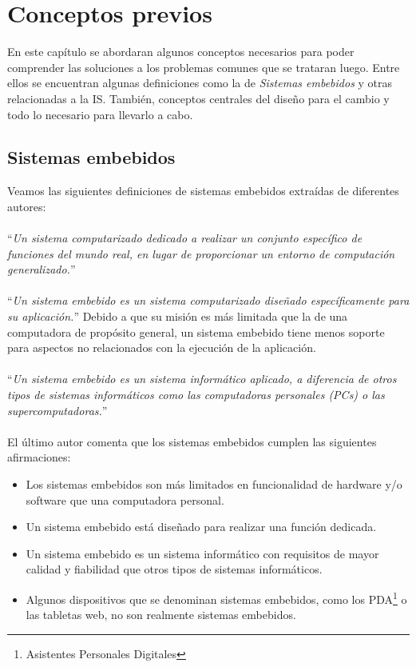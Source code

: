 \chapter{Conceptos previos}

En este capítulo se abordaran algunos conceptos necesarios para poder comprender las soluciones a los problemas comunes que se trataran luego. Entre ellos se encuentran algunas definiciones como la de \textit{Sistemas embebidos} y otras relacionadas a la IS. También, conceptos centrales del diseño para el cambio y todo lo necesario para llevarlo a cabo.


\section{Sistemas embebidos}
Veamos las siguientes definiciones de sistemas embebidos extraídas de diferentes autores:
\\\\
\noindent
``\textit{Un sistema computarizado dedicado a realizar un conjunto específico de funciones del mundo real, en lugar de proporcionar un entorno de computación generalizado.}''~\cite{douglass}
\\\\
\noindent
``\textit{Un sistema embebido es un sistema computarizado diseñado específicamente para su aplicación.}'' Debido a que su misión es más limitada que la de una computadora de propósito general, un sistema embebido tiene menos soporte para aspectos no relacionados con la ejecución de la aplicación.~\cite{elecia}
\\\\
\noindent
``\textit{Un sistema embebido es un sistema informático aplicado, a diferencia de otros tipos de sistemas informáticos como las computadoras personales (PCs) o las supercomputadoras.}''~\cite{noergaard2005embedded}
\\\\
\noindent		
El último autor comenta que los sistemas embebidos cumplen las siguientes afirmaciones:
\begin{itemize}
	\item Los sistemas embebidos son más limitados en funcionalidad de hardware y/o software que una computadora personal.
	\item Un sistema embebido está diseñado para realizar una función dedicada.
	\item Un sistema embebido es un sistema informático con requisitos de mayor calidad y fiabilidad que otros tipos de sistemas informáticos.
	\item Algunos dispositivos que se denominan sistemas embebidos, como los PDA\footnote{Asistentes Personales Digitales} o las tabletas web, no son realmente sistemas embebidos.
\end{itemize}

